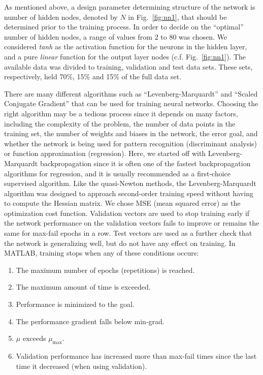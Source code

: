 \documentclass[twocolumn,10pt]{asme2e}
\begin{document}
As mentioned above, a design parameter determining structure of the network is number of hidden nodes, denoted by $N$ in Fig.~\ref{fig:nn1}, that should be determined prior to the training process. In order to decide on the ``optimal'' number of hidden nodes, a range of values from $2$ to $80$ was chosen. We considered \emph{tanh} as the activation function for the neurons in the hidden layer, and a pure \emph{linear} function for the output layer nodes (c.f. Fig.~\ref{fig:nn1}). The available data was divided to training, validation and test data sets. These sets, respectively, held 70\%, 15\% and 15\% of the full data set.

There are many different algorithms such as ``Levenberg-Marquardt'' and ``Scaled Conjugate Gradient'' that can be used for training neural networks. Choosing the right algorithm may be a tedious process since it depends on many factors, including the complexity of the problem, the number of data points in the training set, the number of weights and biases in the network, the error goal, and whether the network is being used for pattern recognition (discriminant analysis) or function approximation (regression). Here, we started off with Levenberg-Marquardt backpropagation \cite{hagan1994training} since it is often one of the fastest backpropagation algorithms for regression, and it is usually recommended as a first-choice supervised algorithm.
Like the quasi-Newton methods, the Levenberg-Marquardt algorithm was designed to approach second-order training speed without having to compute the Hessian matrix. 
We chose MSE (mean squared error) as the optimization cost function. Validation vectors are used to stop training early if the network performance on the validation vectors fails to improve or remains the same for max-fail epochs in a row. Test vectors are used as a further check that the network is generalizing well, but do not have any effect on training. In MATLAB, training stops when any of these conditions occurs:
\begin{enumerate}
\item The maximum number of epochs (repetitions) is reached.
\item The maximum amount of time is exceeded.
\item Performance is minimized to the goal.
\item The performance gradient falls below min-grad.
\item $\mu$ exceeds $\mu_{\max}$.
\item Validation performance has increased more than max-fail times since the last time it decreased (when using validation).
\end{enumerate}
\end{document}

